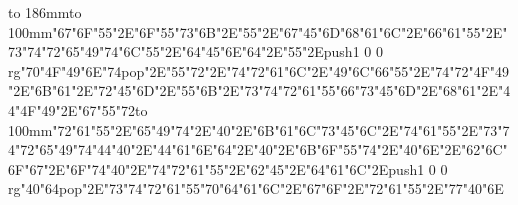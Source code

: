 \hbox to 186mm{\hsize=81mm\vbox to 100mm{\vfill\ipa\char"67\ipa\char"6F\ipa\char"55\ipa\char"2E\ipa\char"6F\ipa\char"55\ipa\char"73\ipa\char"6B\ipa\char"2E\ipa\char"55\ipa\char"2E\ipa\char"67\ipa\char"45\ipa\char"6D\medskip\ipa\char"68\ipa\char"61\ipa\char"6C\ipa\char"2E\ipa\char"66\ipa\char"61\ipa\char"55\ipa\char"2E\ipa\char"73\ipa\char"74\ipa\char"72\ipa\char"65\ipa\char"49\ipa\char"74\medskip\ipa\char"6C\ipa\char"55\ipa\char"2E\ipa\char"64\ipa\char"45\ipa\char"6E\ipa\char"64\ipa\char"2E\ipa\char"55\ipa\char"2E\pdfcolorstack\match push{1 0 0 rg}\ipa\char"70\ipa\char"4F\ipa\char"49\ipa\char"6E\ipa\char"74\pdfcolorstack\match pop{}\ipa\char"2E\ipa\char"55\ipa\char"72\ipa\char"2E\ipa\char"74\ipa\char"72\ipa\char"61\ipa\char"6C\ipa\char"2E\ipa\char"49\ipa\char"6C\ipa\char"66\medskip\ipa\char"55\ipa\char"2E\ipa\char"74\ipa\char"72\ipa\char"4F\ipa\char"49\ipa\char"2E\ipa\char"6B\ipa\char"61\ipa\char"2E\ipa\char"72\ipa\char"45\ipa\char"6D\ipa\char"2E\ipa\char"55\ipa\char"6B\ipa\char"2E\ipa\char"73\ipa\char"74\ipa\char"72\ipa\char"61\ipa\char"55\ipa\char"66\medskip\ipa\char"73\ipa\char"45\ipa\char"6D\ipa\char"2E\ipa\char"68\ipa\char"61\ipa\char"2E\ipa\char"44\ipa\char"4F\ipa\char"49\ipa\char"2E\ipa\char"67\ipa\char"55\ipa\char"72\vfill}\hfill\vbox to 100mm{\vfill\ipa\char"72\ipa\char"61\ipa\char"55\ipa\char"2E\ipa\char"65\ipa\char"49\ipa\char"74\ipa\char"2E\ipa\char"40\ipa\char"2E\ipa\char"6B\ipa\char"61\ipa\char"6C\medskip\ipa\char"73\ipa\char"45\ipa\char"6C\ipa\char"2E\ipa\char"74\ipa\char"61\ipa\char"55\ipa\char"2E\ipa\char"73\ipa\char"74\ipa\char"72\ipa\char"65\ipa\char"49\ipa\char"74\medskip\ipa\char"44\ipa\char"40\ipa\char"2E\ipa\char"44\ipa\char"61\ipa\char"6E\ipa\char"64\ipa\char"2E\ipa\char"40\ipa\char"2E\ipa\char"6B\ipa\char"6F\ipa\char"55\ipa\char"74\ipa\char"2E\ipa\char"40\ipa\char"6E\ipa\char"2E\ipa\char"62\ipa\char"6C\ipa\char"6F\ipa\char"67\ipa\char"2E\ipa\char"6F\ipa\char"74\medskip\ipa\char"40\ipa\char"2E\ipa\char"74\ipa\char"72\ipa\char"61\ipa\char"55\ipa\char"2E\ipa\char"62\ipa\char"45\ipa\char"2E\ipa\char"64\ipa\char"61\ipa\char"6C\ipa\char"2E\pdfcolorstack\match push{1 0 0 rg}\ipa\char"40\ipa\char"64\pdfcolorstack\match pop{}\ipa\char"2E\ipa\char"73\ipa\char"74\ipa\char"72\ipa\char"61\ipa\char"55\ipa\char"70\medskip\ipa\char"64\ipa\char"61\ipa\char"6C\ipa\char"2E\ipa\char"67\ipa\char"6F\ipa\char"2E\ipa\char"72\ipa\char"61\ipa\char"55\ipa\char"2E\ipa\char"77\ipa\char"40\ipa\char"6E\vfill}}\eject
